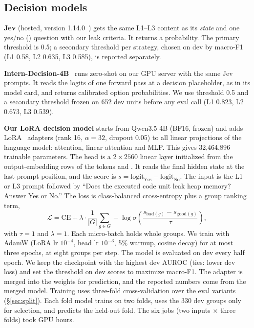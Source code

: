 \subsection{Decision models}
\label{sec:m-decision}
\noindent\textbf{Jev} (hosted, version 1.14.0~\cite{typesafe2026jev}) gets the same L1--L3 content as its \emph{state} and one yes/no () question with our leak criteria.
It returns a probability.
The primary threshold is 0.5; a secondary threshold per strategy, chosen on dev by macro-F1 (L1 0.58, L2 0.635, L3 0.585), is reported separately. %

\noindent\textbf{Intern-Decision-4B}~\cite{zhu2026interndecision} runs zero-shot on our GPU server with the same Jev prompts.
It reads the logits of one forward pass at a decision placeholder, as in its model card, and returns calibrated option probabilities.
We use threshold 0.5 and a secondary threshold frozen on 652 dev units before any eval call (L1 0.823, L2 0.673, L3 0.539). %

\noindent\textbf{Our LoRA decision model} starts from Qwen3.5-4B (BF16, frozen) and adds LoRA~\cite{hu2022lora} adapters (rank 16, $\alpha=32$, dropout 0.05) to all linear projections of the language model: attention, linear attention and MLP. This gives 32,464,896 trainable parameters. %
The head is a $2\times2560$ linear layer initialized from the output-embedding rows of the tokens  and .
It reads the final hidden state at the last prompt position, and the score is $s=\mathrm{logit}_\mathrm{Yes}-\mathrm{logit}_\mathrm{No}$.
The input is the L1 or L3 prompt followed by ``Does the executed code unit leak heap memory? Answer Yes or No.''
The loss is class-balanced cross-entropy plus a group ranking term,
\[
\mathcal{L}=\mathrm{CE}+\lambda\cdot\frac{1}{|G|}\sum_{g\in G}-\log\sigma\!\left(\frac{s_{\mathrm{bad}(g)}-s_{\mathrm{good}(g)}}{\tau}\right),
\]
with $\tau=1$ and $\lambda=1$. Each micro-batch holds whole groups.
We train with AdamW (LoRA lr $10^{-4}$, head lr $10^{-3}$, 5\% warmup, cosine decay) for at most three epochs, at eight groups per step.
The model is evaluated on dev every half epoch.
We keep the checkpoint with the highest dev AUROC (ties: lower dev loss) and set the threshold on dev scores to maximize macro-F1.
The adapter is merged into the weights for prediction, and the reported numbers come from the merged model.
Training uses three-fold cross-validation over the eval variants (\S\ref{sec:split}).
Each fold model trains on two folds, uses the 330 dev groups only for selection, and predicts the held-out fold.
The six jobs (two inputs $\times$ three folds) took  GPU hours.

